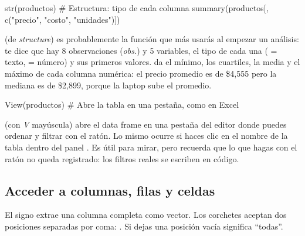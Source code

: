 \begin{rcode}
str(productos)            # Estructura: tipo de cada columna
summary(productos[, c("precio", "costo", "unidades")])
\end{rcode}

 (de \emph{structure}) es probablemente la función que más
usarás al empezar un análisis: te dice que hay 8 observaciones
(\emph{obs.}) y 5 variables, el tipo de cada una ( = texto,
 = número) y sus primeros valores.  da el
mínimo, los cuartiles, la media y el máximo de cada columna numérica: el
precio promedio es de \$4,555 pero la mediana es de \$2,899, porque la
laptop sube el promedio.

\begin{rnoejecutar}
View(productos)     # Abre la tabla en una pestaña, como en Excel
\end{rnoejecutar}

 (con \emph{V} mayúscula) abre el data frame en una pestaña
del editor donde puedes ordenar y filtrar con el ratón. Lo mismo ocurre si
haces clic en el nombre de la tabla dentro del panel .
Es útil para mirar, pero recuerda que lo que hagas con el ratón no queda
registrado: los filtros reales se escriben en código.

\subsection{Acceder a columnas, filas y celdas}

El signo \codigo{\$} extrae una columna completa como vector. Los corchetes
aceptan dos posiciones separadas por coma: . Si
dejas una posición vacía significa ``todas''.

